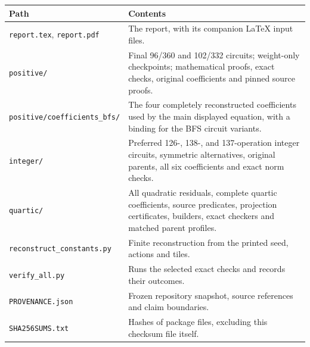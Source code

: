 \begin{longtable}{@{}p{}p{}@{}}
\toprule
Path & Contents\\
\midrule
\endhead
\texttt{report.tex}, \texttt{report.pdf}&
The report, with its companion LaTeX input files.\\
\texttt{positive/}&
Final 96/360 and 102/332 circuits; weight-only checkpoints; mathematical
proofs, exact checks, original coefficients and pinned source proofs.\\
\texttt{positive/coefficients\_bfs/}&
The four completely reconstructed coefficients used by the main displayed
equation, with a binding for the BFS circuit variants.\\
\texttt{integer/}&
Preferred 126-, 138-, and 137-operation integer circuits, symmetric
alternatives, original parents, all six coefficients and exact norm checks.\\
\texttt{quartic/}&
All quadratic residuals, complete quartic coefficients, source predicates,
projection certificates, builders, exact checkers and matched parent profiles.\\
\texttt{reconstruct\_constants.py}&
Finite reconstruction from the printed seed, actions and tiles.\\
\texttt{verify\_all.py}&
Runs the selected exact checks and records their outcomes.\\
\texttt{PROVENANCE.json}&
Frozen repository snapshot, source references and claim boundaries.\\
\texttt{SHA256SUMS.txt}&
Hashes of package files, excluding this checksum file itself.\\
\bottomrule
\end{longtable}

